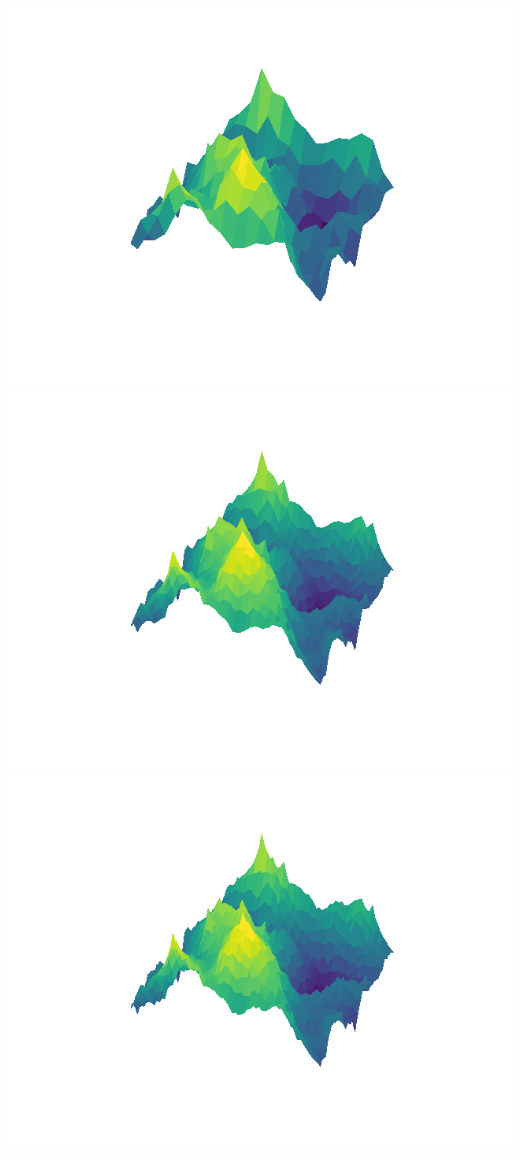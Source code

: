 \documentclass[11pt,class=report,crop=false]{standalone}
\begin{document}
\begin{exemple}
\begin{center}
\includegraphics[scale=\myscale,scale=0.3]{figures/diamant-carre-01-4}
\includegraphics[scale=\myscale,scale=0.3]{figures/diamant-carre-01-5}
\includegraphics[scale=\myscale,scale=0.3]{figures/diamant-carre-01-6}



\end{center}
\end{exemple}
\end{document}
